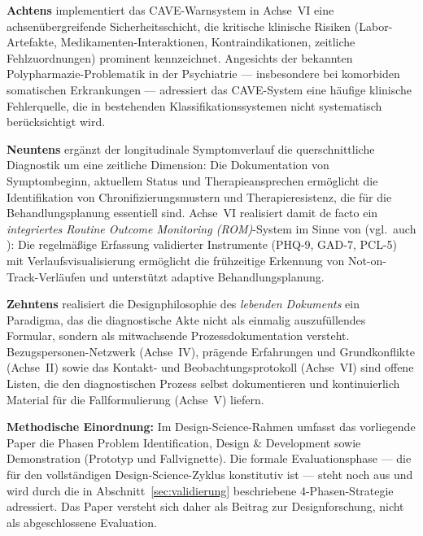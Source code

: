 \documentclass[11pt,a4paper]{article}
\begin{document}
\textbf{Achtens} implementiert das CAVE-Warnsystem in Achse~VI eine achsen\"ubergreifende Sicherheitsschicht, die kritische klinische Risiken (Labor-Artefakte, Medikamenten-Interaktionen, Kontraindikationen, zeitliche Fehlzuordnungen) prominent kennzeichnet. Angesichts der bekannten Polypharmazie-Problematik in der Psychiatrie --- insbesondere bei komorbiden somatischen Erkrankungen --- adressiert das CAVE-System eine h\"aufige klinische Fehlerquelle, die in bestehenden Klassifikationssystemen nicht systematisch ber\"ucksichtigt wird.

\textbf{Neuntens} erg\"anzt der longitudinale Symptomverlauf die querschnittliche Diagnostik um eine zeitliche Dimension: Die Dokumentation von Symptombeginn, aktuellem Status und Therapieansprechen erm\"oglicht die Identifikation von Chronifizierungsmustern und Therapieresistenz, die f\"ur die Behandlungsplanung essentiell sind. Achse~VI realisiert damit de facto ein \textit{integriertes Routine Outcome Monitoring (ROM)}-System im Sinne von \citet{Barkham2023} (vgl.\ auch \citealp{Huber2022}): Die regelm\"a\ss{}ige Erfassung validierter Instrumente (PHQ-9, GAD-7, PCL-5) mit Verlaufsvisualisierung erm\"oglicht die fr\"uhzeitige Erkennung von Not-on-Track-Verl\"aufen und unterst\"utzt adaptive Behandlungsplanung.

\textbf{Zehntens} realisiert die Designphilosophie des \textit{lebenden Dokuments} ein Paradigma, das die diagnostische Akte nicht als einmalig auszuf\"ullendes Formular, sondern als mitwachsende Prozessdokumentation versteht. Bezugspersonen-Netzwerk (Achse~IV), pr\"agende Erfahrungen und Grundkonflikte (Achse~II) sowie das Kontakt- und Beobachtungsprotokoll (Achse~VI) sind offene Listen, die den diagnostischen Prozess selbst dokumentieren und kontinuierlich Material f\"ur die Fallformulierung (Achse~V) liefern.

\vspace{0.5em}
\textbf{Methodische Einordnung:} Im Design-Science-Rahmen \citep{Hevner2004, Peffers2007} umfasst das vorliegende Paper die Phasen Problem Identification, Design \& Development sowie Demonstration (Prototyp und Fallvignette). Die formale Evaluationsphase --- die f\"ur den vollst\"andigen Design-Science-Zyklus konstitutiv ist --- steht noch aus und wird durch die in Abschnitt~\ref{sec:validierung} beschriebene 4-Phasen-Strategie adressiert. Das Paper versteht sich daher als Beitrag zur Designforschung, nicht als abgeschlossene Evaluation.
\end{document}
